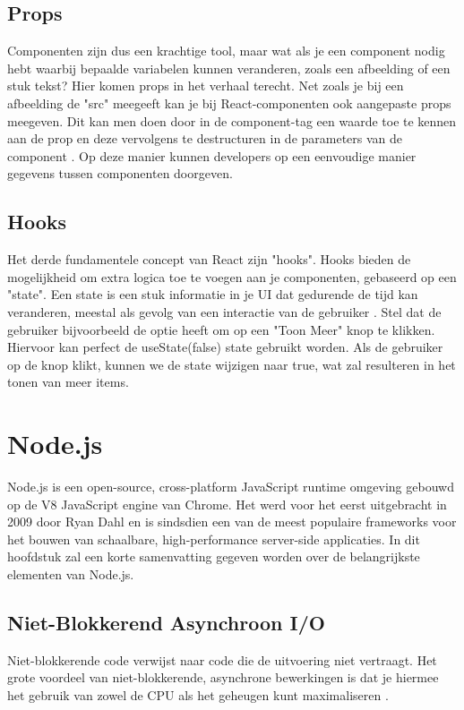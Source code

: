 \subsection{Props}
Componenten zijn dus een krachtige tool, maar wat als je een component nodig hebt waarbij bepaalde variabelen kunnen veranderen, zoals een afbeelding of een stuk tekst? Hier komen props in het verhaal terecht. Net zoals je bij een afbeelding de "src" meegeeft kan je bij React-componenten ook aangepaste props meegeven. Dit kan men doen door in de component-tag een waarde toe te kennen aan de prop en deze vervolgens te destructuren in de parameters van de component \autocite{NextJS2023}. Op deze manier kunnen developers op een eenvoudige manier gegevens tussen componenten doorgeven.

\subsection{Hooks}
Het derde fundamentele concept van React zijn "hooks". Hooks bieden de mogelijkheid om extra logica toe te voegen aan je componenten, gebaseerd op een "state". Een state is een stuk informatie in je UI dat gedurende de tijd kan veranderen, meestal als gevolg van een interactie van de gebruiker \autocite{NextJS2023}. Stel dat de gebruiker bijvoorbeeld de optie heeft om op een "Toon Meer" knop te klikken. Hiervoor kan perfect de useState(false) state gebruikt worden. Als de gebruiker op de knop klikt, kunnen we de state wijzigen naar true, wat zal resulteren in het tonen van meer items.

\section{Node.js}

Node.js is een open-source, cross-platform JavaScript runtime omgeving gebouwd op de V8 JavaScript engine van Chrome. Het werd voor het eerst uitgebracht in 2009 door Ryan Dahl en is sindsdien een van de meest populaire frameworks voor het bouwen van schaalbare, high-performance server-side applicaties. \autocite{Sufiyan2023} In dit hoofdstuk zal een korte samenvatting gegeven worden over de belangrijkste elementen van Node.js.

\subsection{Niet-Blokkerend Asynchroon I/O}

Niet-blokkerende code verwijst naar code die de uitvoering niet vertraagt. Het grote voordeel van niet-blokkerende, asynchrone bewerkingen is dat je hiermee het gebruik van zowel de CPU als het geheugen kunt maximaliseren \autocite{Sarkar2018}.

